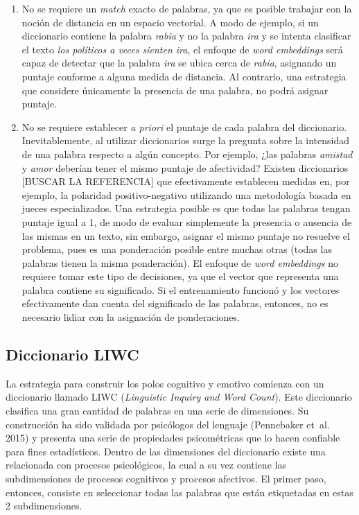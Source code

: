 \documentclass[
  12pt,
]{article}
\begin{document}
\begin{enumerate}
\def\labelenumi{\arabic{enumi}.}
\item
  No se requiere un \emph{match} exacto de palabras, ya que es posible
  trabajar con la noción de distancia en un espacio vectorial. A modo de
  ejemplo, si un diccionario contiene la palabra \emph{rabia} y no la
  palabra \emph{ira} y se intenta clasificar el texto \emph{los
  políticos a veces sienten ira}, el enfoque de \emph{word embeddings}
  será capaz de detectar que la palabra \emph{ira} se ubica cerca de
  \emph{rabia}, asignando un puntaje conforme a alguna medida de
  distancia. Al contrario, una estrategia que considere únicamente la
  presencia de una palabra, no podrá asignar puntaje.
\item
  No se requiere establecer \emph{a priori} el puntaje de cada palabra
  del diccionario. Inevitablemente, al utilizar diccionarios surge la
  pregunta sobre la intensidad de una palabra respecto a algún concepto.
  Por ejemplo, ¿las palabras \emph{amistad} y \emph{amor} deberían tener
  el mismo puntaje de afectividad? Existen diccionarios {[}BUSCAR LA
  REFERENCIA{]} que efectivamente establecen medidas en, por ejemplo, la
  polaridad positivo-negativo utilizando una metodología basada en
  jueces especializados. Una estrategia posible es que todas las
  palabras tengan puntaje igual a 1, de modo de evaluar simplemente la
  presencia o ausencia de las mismas en un texto, sin embargo, asignar
  el mismo puntaje no resuelve el problema, pues es una ponderación
  posible entre muchas otras (todas las palabras tienen la misma
  ponderación). El enfoque de \emph{word embeddings} no requiere tomar
  este tipo de decisiones, ya que el vector que representa una palabra
  contiene su significado. Si el entrenamiento funcionó y los vectores
  efectivamente dan cuenta del significado de las palabras, entonces, no
  es necesario lidiar con la asignación de ponderaciones.
\end{enumerate}

\hypertarget{diccionario-liwc}{%
\subsection{Diccionario LIWC}\label{diccionario-liwc}}

La estrategia para construir los polos cognitivo y emotivo comienza con
un diccionario llamado LIWC (\emph{Linguistic Inquiry and Word Count}).
Este diccionario clasifica una gran cantidad de palabras en una serie de
dimensiones. Su construcción ha sido validada por psicólogos del
lenguaje (Pennebaker et~al. 2015) y presenta una serie de propiedades
psicométricas que lo hacen confiable para fines estadísticos. Dentro de
las dimensiones del diccionario existe una relacionada con procesos
psicológicos, la cual a su vez contiene las subdimensiones de procesos
cognitivos y procesos afectivos. El primer paso, entonces, consiste en
seleccionar todas las palabras que están etiquetadas en estas 2
subdimensiones.
\end{document}
